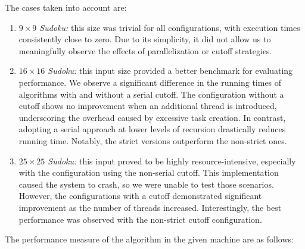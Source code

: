 \documentclass[paper=a4, fontsize=12pt]{scrartcl}
\numberwithin{equation}{section}
\numberwithin{figure}{section}
\numberwithin{table}{section}
\begin{document}
    The cases taken into account are:
    \begin{enumerate}
        \item \textit{$9\times 9$ Sudoku:} this size was trivial for all configurations, with execution times consistently close to zero. 
            Due to its simplicity, it did not allow us to meaningfully observe the effects of parallelization or cutoff strategies.
        \item \textit{$16\times 16$ Sudoku:} this input size provided a better benchmark for evaluating performance.
            We observe a significant difference in the running times of algorithms with and without a serial cutoff. 
            The configuration without a cutoff shows no improvement when an additional thread is introduced, underscoring the overhead caused by excessive task creation. 
            In contrast, adopting a serial approach at lower levels of recursion drastically reduces running time. 
            Notably, the strict versions outperform the non-strict ones.
        \item \textit{$25\times 25$ Sudoku:} this input proved to be highly resource-intensive, especially with the configuration using the non-serial cutoff. 
            This implementation caused the system to crash, so we were unable to test those scenarios. 
            However, the configurations with a cutoff demonstrated significant improvement as the number of threads increased.
            Interestingly, the best performance was observed with the non-strict cutoff configuration.
    \end{enumerate}
    The performance measure of the algorithm in the given machine are as follows: 
\end{document}
